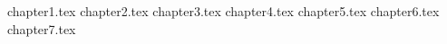 \documentclass[master=ucll,dutch,twoside]{ucllfilip}
\begin{document}
\begin{comment}
\chapter{Lijst van afkortingen en symbolen}
\section*{Afkortingen}
\begin{flushleft}
  \renewcommand{\arraystretch}{1.1}
  \begin{tabularx}{\textwidth}{@{}p{12mm}X@{}}
  \end{tabularx}
\end{flushleft}
\section*{Symbolen}
\begin{flushleft}
  \renewcommand{\arraystretch}{1.1}
  \begin{tabularx}{\textwidth}{@{}p{12mm}X@{}}
  \end{tabularx}
\end{flushleft}
\end{comment}

\listoftodos

\mainmatter

\clearforchapter

%


{chapter1.tex}
{chapter2.tex}
{chapter3.tex}
{chapter4.tex}
{chapter5.tex}
{chapter6.tex}
{chapter7.tex}
\end{document}
